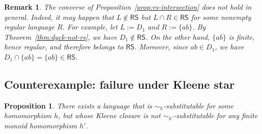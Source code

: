 \documentclass[11pt,a4paper]{article}
\newtheorem{proposition}[theorem]{Proposition}
\newtheorem{remark}[theorem]{Remark}
\begin{document}
\begin{remark}
The converse of Proposition~\ref{prop:rs-intersection} does not hold in general. Indeed, it may happen that $L\notin\mathsf{RS}$ but $L\cap R\in\mathsf{RS}$ for some nonempty regular language $R$. For example, let $L:=D_1$ and $R:=\{ab\}$. By Theorem~\ref{thm:dyck-not-rs}, we have $D_1\notin\mathsf{RS}$. On the other hand, $\{ab\}$ is finite, hence regular, and therefore belongs to $\mathsf{RS}$. Moreover, since $ab\in D_1$, we have $D_1\cap\{ab\}=\{ab\}\in\mathsf{RS}$.
\end{remark}

\subsection{Counterexample: failure under Kleene star}

\begin{proposition}
\label{prop:kstar-not-rs}
There exists a language that is $\sim_h$-substitutable for some homomorphism $h$, but whose Kleene closure is not $\sim_{h'}$-substitutable for any finite monoid homomorphism $h'$.
\end{proposition}
\end{document}
